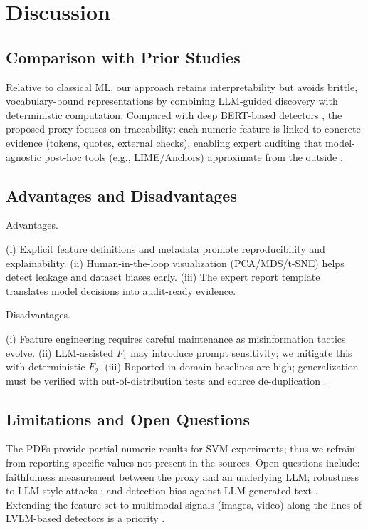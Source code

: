 \documentclass[ai,article,submit,pdftex,moreauthors]{Definitions/mdpi}
\begin{document}
\section{Discussion}

\subsection{Comparison with Prior Studies}
Relative to classical ML, our approach retains interpretability but avoids brittle, vocabulary-bound representations by combining LLM-guided discovery with deterministic computation. Compared with deep BERT-based detectors \cite{kaliyar2021fakebert,keya2021augfakebert}, the proposed proxy focuses on traceability: each numeric feature is linked to concrete evidence (tokens, quotes, external checks), enabling expert auditing that model-agnostic post-hoc tools (e.g., LIME/Anchors) approximate from the outside \cite{lime,anchors}.

\subsection{Advantages and Disadvantages}

Advantages.

(i) Explicit feature definitions and metadata promote reproducibility and explainability. (ii) Human-in-the-loop visualization (PCA/MDS/t-SNE) helps detect leakage and dataset biases early. (iii) The expert report template translates model decisions into audit-ready evidence.

Disadvantages.

(i) Feature engineering requires careful maintenance as misinformation tactics evolve. (ii) LLM-assisted $F_1$ may introduce prompt sensitivity; we mitigate this with deterministic $F_2$. (iii) Reported in-domain baselines are high; generalization must be verified with out-of-distribution tests and source de-duplication \cite{amer2021context,villela2023review}.

\subsection{Limitations and Open Questions}
The PDFs provide partial numeric results for SVM experiments; thus we refrain from reporting specific values not present in the sources. Open questions include: faithfulness measurement between the proxy and an underlying LLM; robustness to LLM style attacks \cite{wu2023sheep,park2024adstyle}; and detection bias against LLM-generated text \cite{su2023biased}. Extending the feature set to multimodal signals (images, video) along the lines of LVLM-based detectors is a priority \cite{liu2024fkaowl}.
\end{document}
